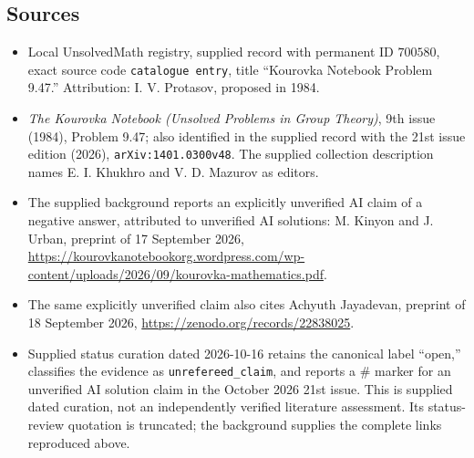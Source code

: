 \documentclass[11pt]{article}
\begin{document}
\subsection{Sources}
\begin{itemize}
\item Local UnsolvedMath registry, supplied record with permanent ID \(700580\), exact source code \texttt{catalogue entry}, title ``Kourovka Notebook Problem 9.47.'' Attribution: I. V. Protasov, proposed in 1984.
\item \emph{The Kourovka Notebook (Unsolved Problems in Group Theory)}, 9th issue (1984), Problem 9.47; also identified in the supplied record with the 21st issue edition (2026), \texttt{arXiv:1401.0300v48}. The supplied collection description names E. I. Khukhro and V. D. Mazurov as editors.
\item The supplied background reports an explicitly unverified AI claim of a negative answer, attributed to unverified AI solutions: M. Kinyon and J. Urban, preprint of 17 September 2026, \url{https://kourovkanotebookorg.wordpress.com/wp-content/uploads/2026/09/kourovka-mathematics.pdf}.
\item The same explicitly unverified claim also cites Achyuth Jayadevan, preprint of 18 September 2026, \url{https://zenodo.org/records/22838025}.
\item Supplied status curation dated 2026-10-16 retains the canonical label ``open,'' classifies the evidence as \texttt{unrefereed\_claim}, and reports a \(\#\) marker for an unverified AI solution claim in the October 2026 21st issue. This is supplied dated curation, not an independently verified literature assessment. Its status-review quotation is truncated; the background supplies the complete links reproduced above.
\end{itemize}
\end{document}
